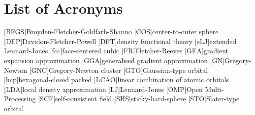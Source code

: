 
\chapter*{List of Acronyms}

\begin{acronym}[ABCDEFGHIJK]
    [BFGS]{Broyden-Fletcher-Goldfarb-Shanno}
    [COS]{center-to-outer sphere}
    [DFP]{Davidon-Fletcher-Powell}
    [DFT]{density functional theory}
    [eLJ]{extended Lennard-Jones}
    [fcc]{face-centered cubic}
    [FR]{Fletcher-Reeves}
	[GEA]{gradient expansion approximation}
	[GGA]{generalised gradient approximation}
    [GN]{Gregory-Newton}
    [GNC]{Gregory-Newton cluster}
    [GTO]{Gaussian-type orbital}
    [hcp]{hexagonal-closed packed}
    [LCAO]{linear combination of atomic orbitals}
    [LDA]{local density approximation}
    [LJ]{Lennard-Jones}
    [OMP]{Open Multi-Processing}
    [SCF]{self-consistent field}
    [SHS]{sticky-hard-sphere}
    [STO]{Slater-type orbital}
\end{acronym}
